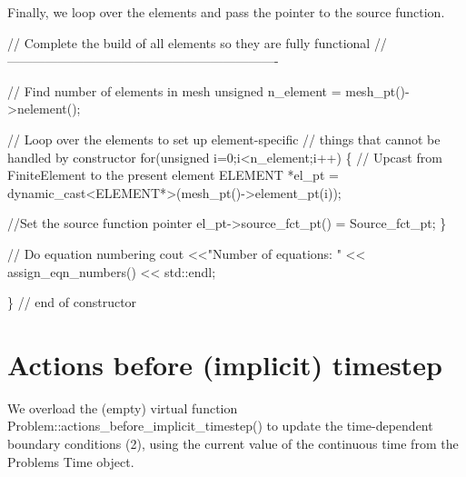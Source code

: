 Finally, we loop over the elements and pass the pointer to the source function.


\begin{DoxyCodeInclude}
 \textcolor{comment}{// Complete the build of all elements so they are fully functional}
 \textcolor{comment}{//----------------------------------------------------------------}

 \textcolor{comment}{// Find number of elements in mesh}
 \textcolor{keywordtype}{unsigned} n\_element = mesh\_pt()->nelement();

 \textcolor{comment}{// Loop over the elements to set up element-specific }
 \textcolor{comment}{// things that cannot be handled by constructor}
 \textcolor{keywordflow}{for}(\textcolor{keywordtype}{unsigned} i=0;i<n\_element;i++)
  \{
   \textcolor{comment}{// Upcast from FiniteElement to the present element}
   ELEMENT *el\_pt = \textcolor{keyword}{dynamic\_cast<}ELEMENT*\textcolor{keyword}{>}(mesh\_pt()->element\_pt(i));

   \textcolor{comment}{//Set the source function pointer}
   el\_pt->source\_fct\_pt() = Source\_fct\_pt;
  \}

 \textcolor{comment}{// Do equation numbering}
 cout <<\textcolor{stringliteral}{"Number of equations: "} << assign\_eqn\_numbers() << std::endl; 

\} \textcolor{comment}{// end of constructor}

\end{DoxyCodeInclude}




 

\hypertarget{index_before_timestep}{}\section{Actions before (implicit) timestep}\label{index_before_timestep}
We overload the (empty) virtual function {\ttfamily Problem\+::actions\+\_\+before\+\_\+implicit\+\_\+timestep()} to update the time-\/dependent boundary conditions (2), using the current value of the continuous time from the {\ttfamily Problem\textquotesingle{}s} {\ttfamily Time} object.


